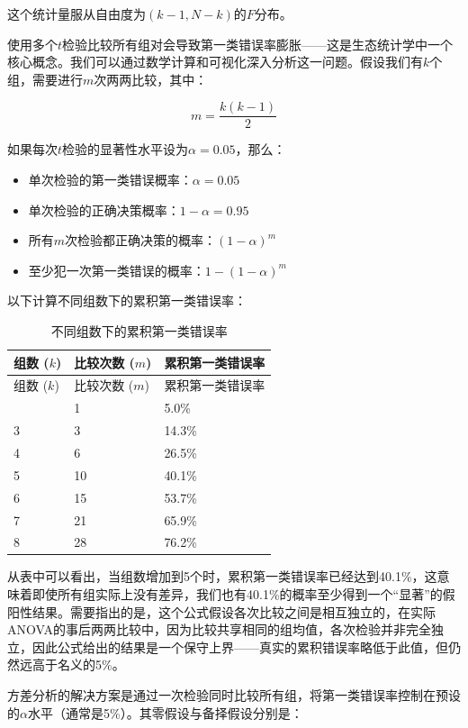 \documentclass[
  twoside,12pt,fontset=none]{ctexbook}
\providecommand{\tightlist}{%
  \setlength{\itemsep}{0pt}\setlength{\parskip}{0pt}}
\begin{document}
这个统计量服从自由度为\((k-1, N-k)\)的\(F\)分布。

使用多个\(t\)检验比较所有组对会导致第一类错误率膨胀------这是生态统计学中一个核心概念。我们可以通过数学计算和可视化深入分析这一问题。假设我们有\(k\)个组，需要进行\(m\)次两两比较，其中：

\[m = \frac{k(k-1)}{2}\]

如果每次\(t\)检验的显著性水平设为\(\alpha = 0.05\)，那么：

\begin{itemize}
\tightlist
\item
  单次检验的第一类错误概率：\(\alpha = 0.05\)
\item
  单次检验的正确决策概率：\(1 - \alpha = 0.95\)
\item
  所有\(m\)次检验都正确决策的概率：\((1 - \alpha)^m\)
\item
  至少犯一次第一类错误的概率：\(1 - (1 - \alpha)^m\)
\end{itemize}

以下计算不同组数下的累积第一类错误率：

\begin{longtable}[]{@{}lll@{}}
\caption{\label{tab:comparison-of-multiple-test-errors} 不同组数下的累积第一类错误率}\tabularnewline
\toprule\noalign{}
组数 (\(k\)) & 比较次数 (\(m\)) & 累积第一类错误率 \\
\midrule\noalign{}
\endfirsthead
\toprule\noalign{}
组数 (\(k\)) & 比较次数 (\(m\)) & 累积第一类错误率 \\
\midrule\noalign{}
\endhead
\bottomrule\noalign{}
\endlastfoot
2 & 1 & 5.0\% \\
3 & 3 & 14.3\% \\
4 & 6 & 26.5\% \\
5 & 10 & 40.1\% \\
6 & 15 & 53.7\% \\
7 & 21 & 65.9\% \\
8 & 28 & 76.2\% \\
\end{longtable}

从表中可以看出，当组数增加到5个时，累积第一类错误率已经达到40.1\%，这意味着即使所有组实际上没有差异，我们也有40.1\%的概率至少得到一个``显著''的假阳性结果。需要指出的是，这个公式假设各次比较之间是相互独立的，在实际ANOVA的事后两两比较中，因为比较共享相同的组均值，各次检验并非完全独立，因此公式给出的结果是一个保守上界------真实的累积错误率略低于此值，但仍然远高于名义的5\%。

方差分析的解决方案是通过一次检验同时比较所有组，将第一类错误率控制在预设的\(\alpha\)水平（通常是5\%）。其零假设与备择假设分别是：
\end{document}
